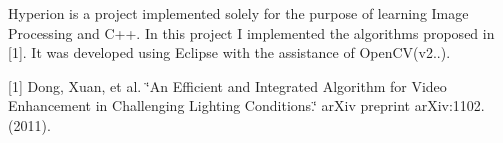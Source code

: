 Hyperion is a project implemented solely for the purpose of learning Image Processing and C++. In this project I implemented the algorithms proposed in \mbox{[}1\mbox{]}. It was developed using Eclipse with the assistance of Open\+CV(v2..).

\mbox{[}1\mbox{]} Dong, Xuan, et al. \char`\"{}\+An Efficient and Integrated Algorithm for Video Enhancement in Challenging Lighting Conditions.\char`\"{} ar\+Xiv preprint ar\+Xiv\+:1102. (2011). 